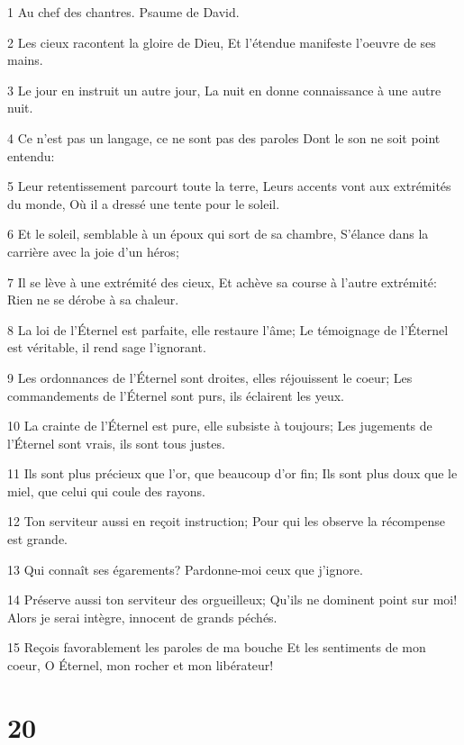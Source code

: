\par 1 Au chef des chantres. Psaume de David.
\par 2 Les cieux racontent la gloire de Dieu, Et l'étendue manifeste l'oeuvre de ses mains.
\par 3 Le jour en instruit un autre jour, La nuit en donne connaissance à une autre nuit.
\par 4 Ce n'est pas un langage, ce ne sont pas des paroles Dont le son ne soit point entendu:
\par 5 Leur retentissement parcourt toute la terre, Leurs accents vont aux extrémités du monde, Où il a dressé une tente pour le soleil.
\par 6 Et le soleil, semblable à un époux qui sort de sa chambre, S'élance dans la carrière avec la joie d'un héros;
\par 7 Il se lève à une extrémité des cieux, Et achève sa course à l'autre extrémité: Rien ne se dérobe à sa chaleur.
\par 8 La loi de l'Éternel est parfaite, elle restaure l'âme; Le témoignage de l'Éternel est véritable, il rend sage l'ignorant.
\par 9 Les ordonnances de l'Éternel sont droites, elles réjouissent le coeur; Les commandements de l'Éternel sont purs, ils éclairent les yeux.
\par 10 La crainte de l'Éternel est pure, elle subsiste à toujours; Les jugements de l'Éternel sont vrais, ils sont tous justes.
\par 11 Ils sont plus précieux que l'or, que beaucoup d'or fin; Ils sont plus doux que le miel, que celui qui coule des rayons.
\par 12 Ton serviteur aussi en reçoit instruction; Pour qui les observe la récompense est grande.
\par 13 Qui connaît ses égarements? Pardonne-moi ceux que j'ignore.
\par 14 Préserve aussi ton serviteur des orgueilleux; Qu'ils ne dominent point sur moi! Alors je serai intègre, innocent de grands péchés.
\par 15 Reçois favorablement les paroles de ma bouche Et les sentiments de mon coeur, O Éternel, mon rocher et mon libérateur!

\chapter{20}

